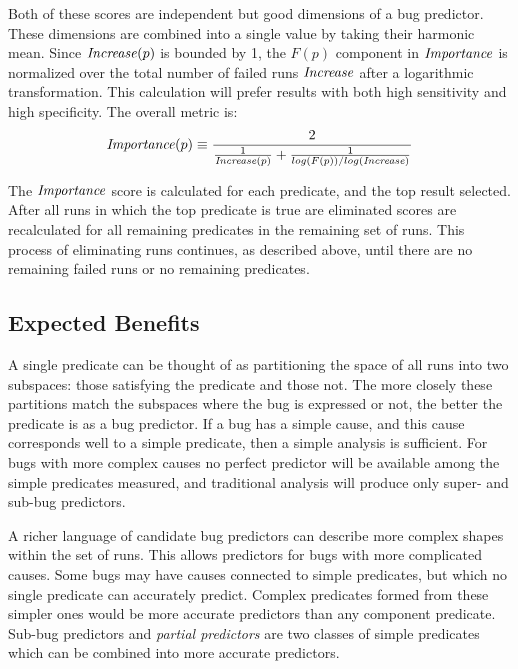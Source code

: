 Both of these scores are independent but good dimensions of a bug predictor.  These dimensions are combined into a single value by taking their harmonic mean.  Since $\mathit{Increase}(p)$ is bounded by 1, the $F(p)$ component in $\mathit{Importance}$ is normalized over the total number of failed runs $\mathit{Increase}$ after a logarithmic transformation.  This calculation will prefer results with both high sensitivity and high specificity.  The overall metric is:
\begin{equation}
\label{eqn2}
\Importance(p) \equiv
\frac{2}{%
  \frac{1}{\Increase(p)}
  +
  \frac{1}{log(F(p)) / log(\NumF)}}
\end{equation}

The $\mathit{Importance}$ score is calculated for each predicate, and the top result selected.  After all runs in which the top predicate is true are eliminated scores are recalculated for all remaining predicates in the remaining set of runs.  This process of eliminating runs continues, as described above, until there are no remaining failed runs or no remaining predicates.

\subsection{Expected Benefits}
A single predicate can be thought of as partitioning the space of all runs into two subspaces: those satisfying the predicate and those not.  The more closely these partitions match the subspaces where the bug is expressed or not, the better the predicate is as a bug predictor.  If a bug has a simple cause, and this cause corresponds well to a simple predicate, then a simple analysis is sufficient.  For bugs with more complex causes no perfect predictor will be available among the simple predicates measured, and traditional analysis will produce only super- and sub-bug predictors.

A richer language of candidate bug predictors can describe more complex shapes within the set of runs.  This allows predictors for bugs with more complicated causes.  Some bugs may have causes connected to simple predicates, but which no single predicate can accurately predict.  Complex predicates formed from these simpler ones would be more accurate predictors than any component predicate.  Sub-bug predictors and \emph{partial predictors} are two classes of simple predicates which can be combined into more accurate predictors.

